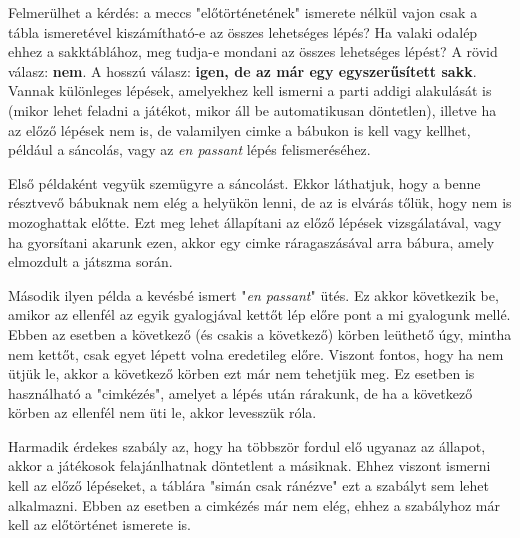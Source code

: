 \documentclass[twoside, a4paper, 12pt]{article}
\begin{document}
Felmerülhet a kérdés: a meccs "előtörténetének" ismerete nélkül vajon csak a tábla ismeretével kiszámítható-e az összes lehetséges lépés? Ha valaki odalép ehhez a sakktáblához, meg tudja-e mondani az összes lehetséges lépést? A rövid válasz: \textbf{nem}. A hosszú válasz: \textbf{igen, de az már egy egyszerűsített sakk}. Vannak különleges lépések, amelyekhez kell ismerni a parti addigi alakulását is (mikor lehet feladni a játékot, mikor áll be automatikusan döntetlen), illetve ha az előző lépések nem is, de valamilyen cimke a bábukon is kell vagy kellhet, például a sáncolás, vagy az \textit{en passant} lépés felismeréséhez.

Első példaként vegyük szemügyre a sáncolást. Ekkor láthatjuk, hogy a benne résztvevő bábuknak nem elég a helyükön lenni, de az is elvárás tőlük, hogy nem is mozoghattak előtte. Ezt meg lehet állapítani az előző lépések vizsgálatával, vagy ha gyorsítani akarunk ezen, akkor egy cimke ráragaszásával arra bábura, amely elmozdult a játszma során.

Második ilyen példa a kevésbé ismert "\textit{en passant}" ütés. Ez akkor következik be, amikor az ellenfél az egyik gyalogjával kettőt lép előre pont a mi gyalogunk mellé. Ebben az esetben a következő (és csakis a következő) körben leüthető úgy, mintha nem kettőt, csak egyet lépett volna eredetileg előre. Viszont fontos, hogy ha nem ütjük le, akkor a következő körben ezt már nem tehetjük meg. Ez esetben is használható a "cimkézés", amelyet a lépés után rárakunk, de ha a következő körben az ellenfél nem üti le, akkor levesszük róla.

Harmadik érdekes szabály az, hogy ha többször fordul elő ugyanaz az állapot, akkor a játékosok felajánlhatnak döntetlent a másiknak. Ehhez viszont ismerni kell az előző lépéseket, a táblára "simán csak ránézve" ezt a szabályt sem lehet alkalmazni. Ebben az esetben a cimkézés már nem elég, ehhez a szabályhoz már kell az előtörténet ismerete is.
\end{document}
